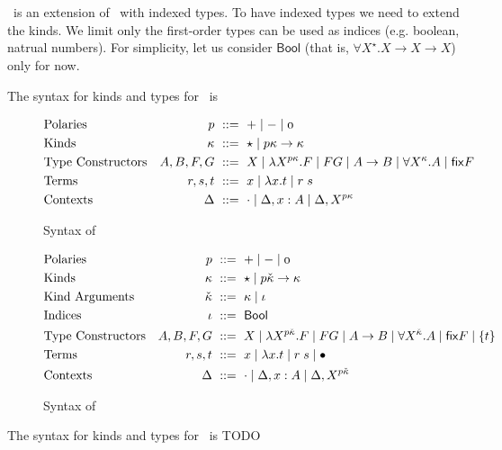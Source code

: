 \section{\Fixi}
\Fixi\ is an extension of \Fixw\ with indexed types.
To have indexed types we need to extend the kinds.
We limit only the first-order types can be used as indices
(e.g. boolean, natrual numbers).
For simplicity, let us consider $\mathsf{Bool}$
(that is, $\forall X^\star.X\to X\to X$) only for now.


The syntax for kinds and types for \Fixw\ is
\begin{figure}
\begin{align*}
&\text{Polaries}
	& p		&~ ::= ~ + \mid - \mid \oz
\\
&\text{Kinds}
	& \kappa	&~ ::= ~ \star \mid p\kappa \to \kappa
\\
&\text{Type Constructors}
	& A,B,F,G	&~ ::= ~ X
			\mid \lambda X^{p\kappa}.F
			\mid F G
			\mid A\to B
			\mid \forall X^\kappa . A
			\mid \fix F
\\
&\text{Terms}
	& r,s,t		&~ ::= ~ x \mid \lambda x.t \mid r\;s
\\
&\text{Contexts}
	& \Delta	&~ ::= ~ \cdot
			\mid \Delta, x:A
			\mid \Delta, X^{p\kappa}
\end{align*}
\caption{Syntax of \Fixw}
\label{tbl:syntaxFixw}
\end{figure}

\begin{figure}
\begin{align*}
&\text{Polaries}
	& p			&~ ::= ~ + \mid - \mid \oz
\\
&\text{Kinds}
 	& \kappa		&~ ::= ~ \star
				\mid  p\ka \to \kappa
\\
&\text{Kind Arguments}
	& \ka	&~ ::= ~ \kappa \mid \iota
\\
&\text{Indices}
	& \iota &~::=~ \Bool %
\\
&\text{Type Constructors}
	& A,B,F,G		&~ ::= ~ X
				\mid \lambda X^{p\ka}.F
				\mid F G
				\mid A\to B
				\mid \forall X^\ka . A
				\mid \fix F
				\mid \{t\}
\\
&\text{Terms}
	& r,s,t			&~ ::= ~ x \mid \lambda x.t \mid r\;s
				\mid \bullet
\\
&\text{Contexts}
	& \Delta		&~ ::= ~ \cdot
				\mid \Delta, x : A
				\mid \Delta, X^{p\ka}
\end{align*}
\caption{Syntax of \Fixi}
\label{tbl:syntaxFixi}
\end{figure}

The syntax for kinds and types for \Fixi\ is TODO


